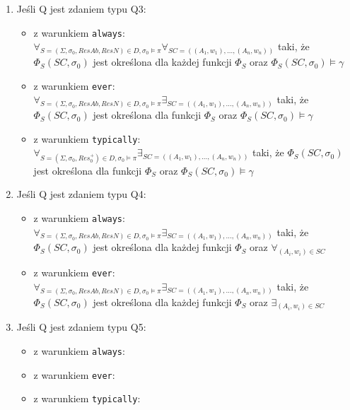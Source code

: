 \documentclass{article}
\begin{document}
\begin{enumerate}
	\item Jeśli Q jest zdaniem typu Q3:
	\begin{itemize}
		\item z warunkiem \texttt{always}: 
		$\forall_{S=(\Sigma, \sigma_{0}, ResAb, ResN) \in D, \sigma_{0} \models \pi} \forall_{SC=((A_{1}, w_{1}), \dots, (A_{n}, w_{n}))}$ taki, że $\Phi_{S}(SC, \sigma_{0})$ jest określona dla każdej funkcji $\Phi_{S}$ oraz $\Phi_{S}(SC, \sigma_{0}) \models \gamma$
		\item z warunkiem \texttt{ever}:
		$\forall_{S=(\Sigma, \sigma_{0}, ResAb, ResN) \in D, \sigma_{0} \models \pi} \exists_{SC=((A_{1}, w_{1}), \dots, (A_{n}, w_{n}))}$ taki, że $\Phi_{S}(SC, \sigma_{0})$ jest określona dla funkcji $\Phi_{S}$ oraz $\Phi_{S}(SC, \sigma_{0}) \models \gamma$
		\item z warunkiem \texttt{typically}:
		$\forall_{S=(\Sigma, \sigma_{0}, Res_{0}^{+}) \in D, \sigma_{0} \models \pi} \exists_{SC=((A_{1}, w_{1}), \dots, (A_{n}, w_{n}))}$ taki, że $\Phi_{S}(SC, \sigma_{0})$ jest określona dla funkcji $\Phi_{S}$ oraz $\Phi_{S}(SC, \sigma_{0}) \models \gamma$
	\end{itemize}
	\item Jeśli Q jest zdaniem typu Q4:
	\begin{itemize}
		\item z warunkiem \texttt{always}: 
		$\forall_{S=(\Sigma, \sigma_{0}, ResAb, ResN) \in D, \sigma_{0} \models \pi} \exists_{SC=((A_{1}, w_{1}), \dots, (A_{n}, w_{n}))}$ taki, że $\Phi_{S}(SC, \sigma_{0})$ jest określona dla każdej funkcji $\Phi_{S}$ oraz $\forall_{(A_{i}, w_{i}) \in SC}$
		\item z warunkiem \texttt{ever}:
		$\forall_{S=(\Sigma, \sigma_{0}, ResAb, ResN) \in D, \sigma_{0} \models \pi} \exists_{SC=((A_{1}, w_{1}), \dots, (A_{n}, w_{n}))}$ taki, że $\Phi_{S}(SC, \sigma_{0})$ jest określona dla każdej funkcji $\Phi_{S}$ oraz $\exists_{(A_{i}, w_{i}) \in SC}$
	\end{itemize}
	\item Jeśli Q jest zdaniem typu Q5:
	\begin{itemize}
		\item z warunkiem \texttt{always}: 
		
		\item z warunkiem \texttt{ever}:
		
		\item z warunkiem \texttt{typically}:
		
	\end{itemize}
\end{enumerate} 
\end{document}
